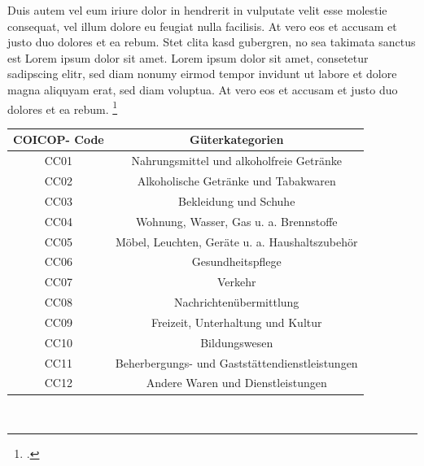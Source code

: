 	Duis autem vel eum iriure dolor in hendrerit in vulputate velit esse molestie consequat, vel illum dolore eu feugiat nulla facilisis. 
	At vero eos et accusam et justo duo dolores et ea rebum. Stet clita kasd gubergren, no sea takimata sanctus est Lorem ipsum dolor sit amet. Lorem ipsum dolor sit amet, consetetur sadipscing elitr, sed diam nonumy eirmod tempor invidunt ut labore et dolore magna aliquyam erat, sed diam voluptua. At vero eos et accusam et justo duo dolores et ea rebum. \footcite{Lang1997}
	
	\begin{center}
		\begin{tabular}{  c | c } \label{tab:002}
			\textbf{COICOP- Code} &	\textbf{Güterkategorien} \\
			\hline
			CC01 	&Nahrungsmittel und alkoholfreie Getränke\\
			\hline
			CC02 	&Alkoholische Getränke und Tabakwaren\\
			\hline
			CC03 	&Bekleidung und Schuhe\\
			\hline
			CC04 	&Wohnung, Wasser, Gas u. a. Brennstoffe\\
			\hline
			CC05 	&Möbel, Leuchten, Geräte u. a. Haushaltszubehör\\
			\hline
			CC06 	&Gesundheitspflege\\
			\hline
			CC07 	&Verkehr\\
			\hline
			CC08 	&Nachrichtenübermittlung\\
			\hline
			CC09 	&Freizeit, Unterhaltung und Kultur\\
			\hline
			CC10 	&Bildungswesen\\
			\hline
			CC11 	&Beherbergungs- und Gaststättendienstleistungen\\
			\hline
			CC12 	&Andere Waren und Dienstleistungen 
		\end{tabular}	\\
	\end{center}
	
